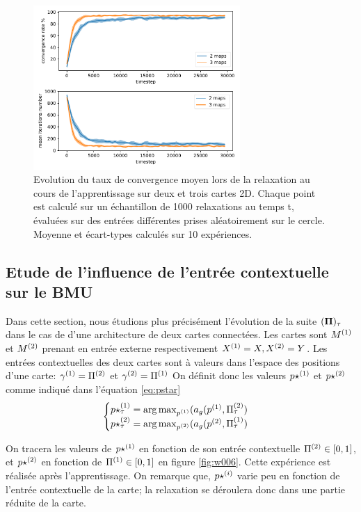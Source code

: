 \begin{figure}
\centering
\includegraphics[width=0.7\textwidth]{2D_conv_evolution_total.pdf}
\caption{Evolution du taux de convergence moyen lors de la relaxation au cours de l'apprentissage sur deux et trois cartes 2D. Chaque point est calculé sur un échantillon de 1000 relaxations au temps t, évaluées sur des entrées différentes prises aléatoirement sur le cercle. Moyenne et écart-types calculés sur 10 expériences.}
\label{fig:conv_evolution2D}
\end{figure}

\subsection{Etude de l'influence de l'entrée contextuelle sur le BMU}

Dans cette section, nous étudions plus précisément l'évolution de la suite $(\mathbf{\Pi})_{\tau}$ dans le cas de d'une architecture de deux cartes connectées. Les cartes sont $M^{({1})}$ et $M^{({2})}$ prenant en entrée externe respectivement $X^{({1})} = X, X^{({2})} = Y$.
Les entrées contextuelles des deux cartes sont à valeurs dans l'espace des positions d'une carte: $\gamma^{({1})} = \Pi^{({2})}$ et $\gamma^{({2})} = \Pi^{({1})}$
On définit donc les valeurs $p\star^{({1})}$ et $p\star^{({2})}$ comme indiqué dans l'équation \ref{eq:pstar}
\begin{equation} 
\begin{cases}
	p\star^{({1})}_{\tau} = \operatorname*{arg\,max}_{p^{({1})}}(a_g(p^{({1})},\Pi^{({2})}_{\tau}) \\
	p\star^{({2})}_{\tau} = \operatorname*{arg\,max}_{p^{({2})}}(a_g(p^{({2})},\Pi^{({1})}_{\tau}) \\
\end{cases}
\end{equation}

On tracera les valeurs de $p\star^{({1})}$ en fonction de son entrée contextuelle $\Pi^{({2})} \in [0,1]$, et $p\star^{({2})}$ en fonction de $\Pi^{({1})} \in [0,1]$ en figure \ref{fig:w006}.
Cette expérience est réalisée après l'apprentissage. On remarque que, $p\star^{({i})}$ varie peu en fonction de l'entrée contextuelle de la carte; la relaxation se déroulera donc dans une partie réduite de la carte.

